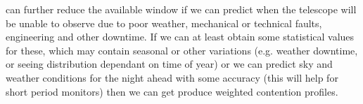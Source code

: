 can further reduce the available window if we can predict when the telescope will be unable to observe due to poor weather, mechanical or technical faults, engineering and other downtime. If we can at least obtain some statistical values for these, which may contain seasonal or other variations (e.g. weather downtime, or seeing distribution dependant on time of year) or we can predict sky and weather conditions for the night ahead with some accuracy (this will help for short period monitors) then we can get produce weighted contention profiles.
